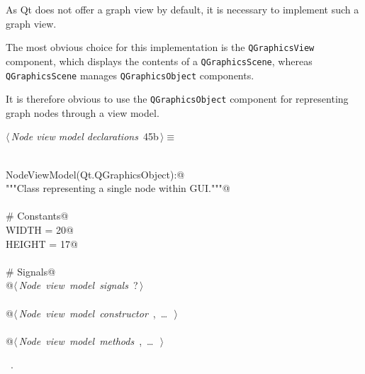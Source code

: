 \documentclass[
    a4paper,      %
    10pt,         %
    openright,    %
    notitlepage,  %
    parskip=half, %
]{scrreprt}       %
\theoremstyle{definition}                    %
\begin{document}
As Qt does not offer a graph view by default, it is necessary to implement such
a graph view.

The most obvious choice for this implementation is the
\verb+QGraphicsView+ component, which displays the contents of a
\verb+QGraphicsScene+, whereas \verb+QGraphicsScene+ manages \verb+QGraphicsObject+
components.

It is therefore obvious to use the \verb+QGraphicsObject+ component
for representing graph nodes through a view model.

\begin{flushleft} \small
\begin{minipage}{\linewidth}\label{scrap59}\raggedright\small
{} $\langle\,${\itshape Node view model declarations}\nobreak\ {\footnotesize {45b}}$\,\rangle\equiv$
\vspace{-1exm}
\begin{list}{}{} \item
\mbox{}\lstinline@@\\
\mbox{}\lstinline@class NodeViewModel(Qt.QGraphicsObject):@\\
\mbox{}\lstinline@    """Class representing a single node within GUI."""@\\
\mbox{}\lstinline@@\\
\mbox{}\lstinline@    # Constants@\\
\mbox{}\lstinline@    WIDTH = 20@\\
\mbox{}\lstinline@    HEIGHT = 17@\\
\mbox{}\lstinline@@\\
\mbox{}\lstinline@    # Signals@\\
\mbox{}\lstinline@    @\hbox{$\langle\,${\itshape Node view model signals}\nobreak\ {\footnotesize ?}$\,\rangle$}\lstinline@@\\
\mbox{}\lstinline@@\\
\mbox{}\lstinline@    @\hbox{$\langle\,${\itshape Node view model constructor}\nobreak\ {\footnotesize {}, \ldots\ }$\,\rangle$}\lstinline@@\\
\mbox{}\lstinline@@\\
\mbox{}\lstinline@    @\hbox{$\langle\,${\itshape Node view model methods}\nobreak\ {\footnotesize {}, \ldots\ }$\,\rangle$}\lstinline@@\\
\mbox{}\lstinline@@{\NWsep}
\end{list}
\vspace{-1.5ex}
\footnotesize
\begin{list}{}{\setlength{\itemsep}{-\parsep}\setlength{\itemindent}{-\leftmargin}}
\item \NWtxtMacroRefIn\ .

\item{}
\end{list}
\end{minipage}\vspace{4ex}
\end{flushleft}
\end{document}

